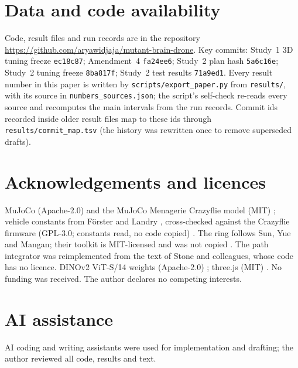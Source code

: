\documentclass[10pt,twocolumn]{article}
\begin{document}
\section*{Data and code availability}
Code, result files and run records are in the repository \url{https://github.com/aryawidjaja/mutant-brain-drone}. Key commits: Study~1 3D tuning freeze \texttt{ec18c87}; Amendment~4 \texttt{fa24ee6}; Study~2 plan hash \texttt{5a6c16e}; Study~2 tuning freeze \texttt{8ba817f}; Study~2 test results \texttt{71a9ed1}. Every result number in this paper is written by \texttt{scripts/export\_paper.py} from \texttt{results/}, with its source in \texttt{numbers\_sources.json}; the script's self-check re-reads every source and recomputes the main intervals from the run records. Commit ids recorded inside older result files map to these ids through \texttt{results/commit\_map.tsv} (the history was rewritten once to remove superseded drafts).

\section*{Acknowledgements and licences}
MuJoCo (Apache-2.0) and the MuJoCo Menagerie Crazyflie model (MIT) \citep{mujoco2012,menagerie2022}; vehicle constants from Förster \citep{forster2015} and Landry \citep{landry2015}, cross-checked against the Crazyflie firmware (GPL-3.0; constants read, no code copied) \citep{cffirmware}. The ring follows Sun, Yue and Mangan; their toolkit is MIT-licensed and was not copied \citep{suntoolkit2024}. The path integrator was reimplemented from the text of Stone and colleagues, whose code has no licence. DINOv2 ViT-S/14 weights (Apache-2.0) \citep{dinov22023}; three.js (MIT) \citep{threejs2026}. No funding was received. The author declares no competing interests.

\section*{AI assistance}
AI coding and writing assistants were used for implementation and drafting; the author reviewed all code, results and text.

\small\raggedright


\end{document}
